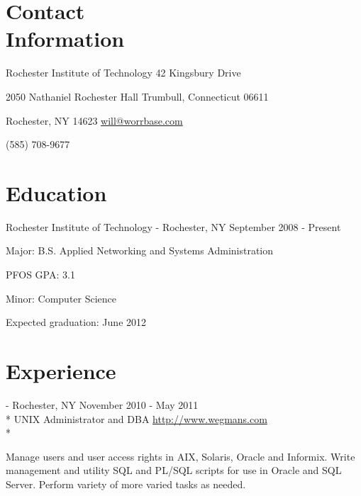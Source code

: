 \documentclass[letter,margin,line]{resume}
\newcommand{\rurl}[1]{\hfill {\footnotesize \url{#1}}}
\newcommand{\rdate}[1]{\hfill {\small #1}}
\renewcommand{\employer}[5]{\item[#1] - #2 \rdate{#3} \\* #4 \rurl{#5} \\*}
\begin{document}
\begin{resume}
\section{\mysidestyle Contact \\ Information} \vspace{2mm}
	\begin{asparablank}
		\item Rochester Institute of Technology \hfill 42 Kingsbury Drive
		\item 2050 Nathaniel Rochester Hall \hfill Trumbull, Connecticut 06611
		\item Rochester, NY 14623 \hfill
		\href{mailto:will@worrbase.com}{will@worrbase.com}
		\item (585) 708-9677 \hfill
	\end{asparablank}

\section{\mysidestyle Education}
	\begin{compactdesc}
		\item[Rochester Institute of Technology] - Rochester, NY \rdate{September 2008 - Present}
		\begin{compactitem} { \small
			\item Major: B.S. Applied Networking and Systems Administration
			\item PFOS GPA: 3.1
			\item Minor: Computer Science
			\item Expected graduation: June 2012
		} \end{compactitem}
	\end{compactdesc}

\section{\mysidestyle Experience}
	\begin{asparadesc}
        \employer{Wegmans Food Markets}{Rochester, NY}{November 2010 - May 2011}{UNIX Administrator and DBA}{http://www.wegmans.com}

        \small
        Manage users and user access rights in AIX, Solaris, Oracle and
        Informix. Write management and utility SQL and PL/SQL scripts for use in Oracle and
        SQL Server.  Perform variety of more varied tasks as needed.
		\normalsize
		\\
		

\end{asparadesc}
\end{resume}
\end{document}
